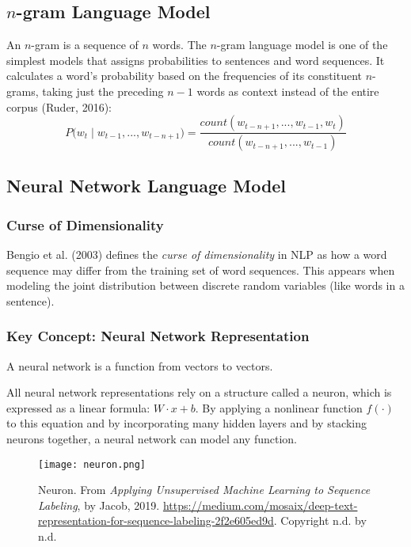 \subsection{$n$-gram Language Model}

An $n$-gram is a sequence of $n$ words. The $n$-gram language model is one of the simplest models that assigns probabilities to sentences and word sequences. It calculates a word's probability based on the frequencies of its constituent $n$-grams, taking just the preceding $n-1$ words as context instead of the entire corpus (Ruder, 2016): 
$$
P \Big(w_t \; | \; w_{t-1}, ..., w_{t-n+1} \Big) = \frac {count(w_{t-n+1},...,w_{t-1},w_t)} {count(w_{t-n+1},...,w_{t-1})}
$$

\subsection{Neural Network Language Model}

\subsubsection{Curse of Dimensionality}

Bengio et al. (2003) defines the \emph{curse of dimensionality} in NLP as how a word sequence may differ from the training set of word sequences. This appears when modeling the joint distribution between discrete random variables (like words in a sentence). 

\subsubsection{Key Concept: Neural Network Representation}

A neural network is a function from vectors to vectors. 

All neural network representations rely on a structure called a neuron, which is expressed as a linear formula: $W \cdot x + b$. By applying a nonlinear function $f(\cdot)$ to this equation and by incorporating many hidden layers and by stacking neurons together, a neural network can model any function. 

\begin{figure}[h]
\vspace{-5pt}
\centering
\texttt{[image: neuron.png]}
\vspace{-5pt}
\caption{\footnotesize Neuron. From \emph{Applying Unsupervised Machine Learning to Sequence Labeling}, by Jacob, 2019. \url{https://medium.com/mosaix/deep-text-representation-for-sequence-labeling-2f2e605ed9d}. Copyright n.d. by n.d.}
\vspace{-5pt}
\end{figure}

